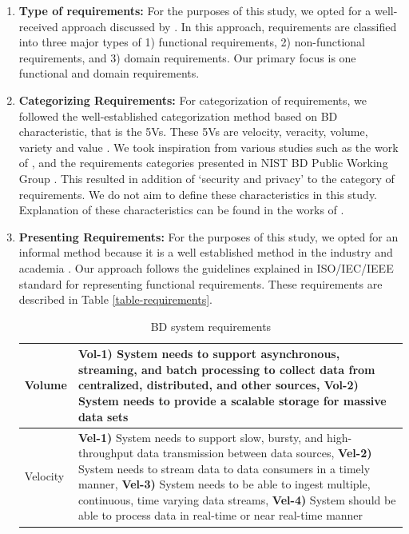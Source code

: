 \documentclass[a4paper,11pt,article,oneside]{memoir}
\begin{document}
\begin{enumerate}
    \item \textbf{Type of requirements:} For the purposes of this study, we opted for a well-received approach discussed by \citet{laplante2017requirements}. In this approach, requirements are classified into three major types of 1) functional requirements, 2) non-functional requirements, and 3) domain requirements. Our primary focus is one functional and domain requirements. 
    \item \textbf{Categorizing Requirements:} For categorization of requirements, we followed the well-established categorization method based on BD characteristic, that is the 5Vs. These 5Vs are velocity, veracity, volume, variety and value \citep{rad2017big}. We took inspiration from various studies such as the work of \citet{nadal2017software}, and the requirements categories presented in NIST BD Public Working Group \citep{Chang.2019}. This resulted in addition of `security and privacy' to the category of requirements. We do not aim to define these characteristics in this study. Explanation of these characteristics can be found in the works of \citet{rada2017hype}.
    \item \textbf{Presenting Requirements:} For the purposes of this study, we opted for an informal method because it is a well established method in the industry and academia \citep{kassab2014state}. Our approach follows the guidelines explained in ISO/IEC/IEEE standard \citet{ISO29148} for representing functional requirements. These requirements are described in Table \ref{table-requirements}.
    \begin{table}[h]
        \centering
        \caption{BD system requirements}
        \renewcommand*{\arraystretch}{1.1}
        \begin{tabular}{|m{1.2cm}|m{14cm}|}
    
            \hline
    
            Volume &
    
            \textbf{Vol-1)} System needs to support asynchronous, streaming, and batch processing to collect data from centralized, distributed, and other sources, \textbf{Vol-2)} System needs to provide a scalable storage for massive data sets 
            \\
            \hline
            Velocity & 
            
            \textbf{Vel-1)} System needs to support slow, bursty, and high-throughput data transmission between data sources, \textbf{Vel-2)} System needs to stream data to data consumers in a timely manner, \textbf{Vel-3)} System needs to be able to ingest multiple, continuous, time varying data streams, \textbf{Vel-4)} System should be able to process data in real-time or near real-time manner 
            \\ 
    

\end{tabular}
\end{table}
\end{enumerate}
\end{document}
